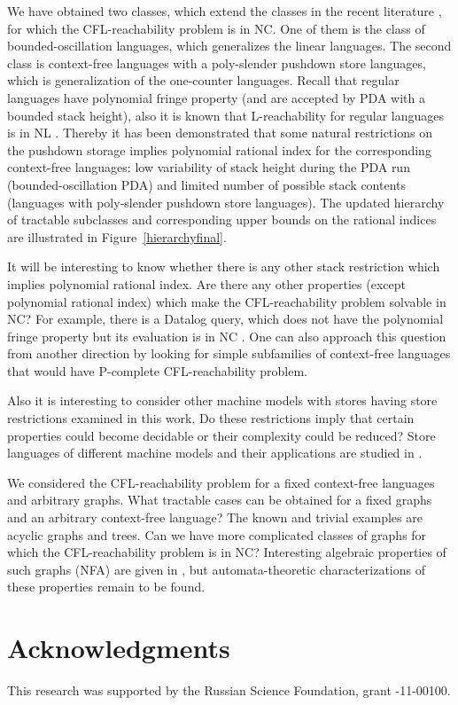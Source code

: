 \documentclass{ws-ijfcs}
\begin{document}
We have obtained two classes, which extend the classes in the recent literature \cite{ChainQ, labelledGraphs, LReach, Regularrealizability, Ullman}, for which the CFL-reachability problem is in NC. One of them is the class of bounded-oscillation languages, which generalizes the linear languages. The second class is context-free languages with a poly-slender pushdown store languages, which is generalization of the one-counter languages. Recall that regular languages have polynomial fringe property (and are accepted by PDA with a bounded stack height), also it is known that L-reachability for regular languages is in NL \cite{LReach, Yannakakis}. Thereby it has been demonstrated that some natural restrictions on the pushdown storage implies polynomial rational index for the corresponding context-free languages: low variability of stack height during the PDA run (bounded-oscillation PDA) and limited number of possible stack contents (languages with poly-slender pushdown store languages). The updated hierarchy of tractable subclasses and corresponding upper bounds on the rational indices are illustrated in Figure~\ref{hierarchyfinal}.


It will be interesting to know whether there is any other stack restriction which implies polynomial rational index. Are there any other properties (except polynomial rational index) which make the CFL-reachability problem solvable in NC? For example, there is a Datalog query, which does not have the polynomial fringe property but its evaluation is in NC \cite{Kanellakis}. One can also approach this question from another direction by looking for simple subfamilies of context-free languages that would have P-complete CFL-reachability problem.


Also it is interesting to consider other machine models with stores having store restrictions examined in this work. Do these restrictions imply that certain properties could become decidable or their complexity could be reduced? Store languages of different machine models and their applications are studied in \cite{ Ibarra2018OnSL, IBARRA201928}.


We considered the CFL-reachability problem for a fixed context-free languages and arbitrary graphs. What tractable cases can be obtained for a fixed graphs and an arbitrary context-free language? The known and trivial examples are acyclic graphs and trees. Can we have more complicated classes of graphs for which the CFL-reachability problem is in NC? Interesting algebraic properties of such graphs (NFA) are given in \cite{ganardi2016circuit}, but automata-theoretic characterizations of these properties remain to be found.




\section*{Acknowledgments}
This research was supported by the Russian Science Foundation, grant -11-00100.



  

\end{document}
